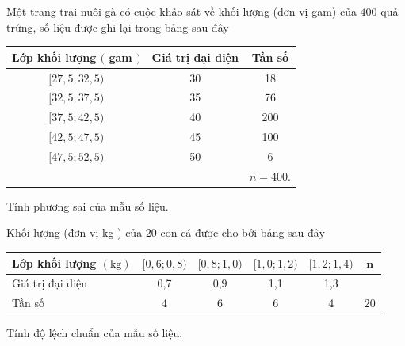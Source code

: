 \begin{bt}%
Một trang trại nuôi gà có cuộc khảo sát về khối lượng (đơn vị gam) của $400$ quả trứng, số liệu được ghi lại trong bảng sau đây
\begin{center}
\begin{tabular}{|c|c|c|}
\hline Lớp khối lượng $($ gam $)$ & Giá trị đại diện & Tần số \\
\hline$[27{,}5 ; 32{,}5)$ & 30 & 18 \\
\hline$[32{,}5 ; 37{,}5)$ & 35 & 76 \\
\hline$[37{,}5 ; 42{,}5)$ & 40 & 200 \\
\hline$[42{,}5 ; 47{,}5)$ & 45 & 100 \\
\hline$[47{,}5 ; 52{,}5)$ & 50 & 6 \\
\hline & & $n=400$. \\
\hline
\end{tabular}
\end{center}
Tính phương sai của mẫu số liệu.
\end{bt}

\begin{bt}%
Khối lượng (đơn vị kg ) của $20$ con cá được cho bởi bảng sau đây
\begin{center}
\begin{tabular}{|l|c|c|c|c|c|}
\hline Lớp khối lượng $(\mathrm{kg})$ & {$[0{,}6 ; 0{,}8)$} & {$[0{,}8 ; 1{,}0)$} & {$[1{,}0 ; 1{,}2)$} & {$[1{,}2 ; 1{,}4)$} & $\mathbf{n}$ \\
\hline Giá trị đại diện & 0{,}7 & 0{,}9 & 1{,}1 & 1{,}3 & \\
\hline Tần số & 4 & 6 & 6 & 4 & $20$ \\
\hline
\end{tabular}
\end{center}
Tính độ lệch chuẩn của mẫu số liệu.
\end{bt}

